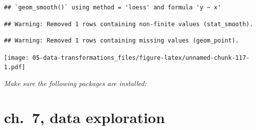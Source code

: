 \documentclass[]{book}
\newenvironment{Shaded}{\begin{snugshade}}{\end{snugshade}}
\newcommand{\DataTypeTok}[1]{\textcolor[rgb]{0.13,0.29,0.53}{#1}}
\newcommand{\KeywordTok}[1]{\textcolor[rgb]{0.13,0.29,0.53}{\textbf{#1}}}
\newcommand{\NormalTok}[1]{#1}
\newcommand{\OperatorTok}[1]{\textcolor[rgb]{0.81,0.36,0.00}{\textbf{#1}}}
\newcommand{\OtherTok}[1]{\textcolor[rgb]{0.56,0.35,0.01}{#1}}
\newcommand{\StringTok}[1]{\textcolor[rgb]{0.31,0.60,0.02}{#1}}
\theoremstyle{definition}
\theoremstyle{definition}
\theoremstyle{definition}
\theoremstyle{remark}
\begin{document}
\begin{Shaded}
\end{Shaded}

\begin{verbatim}
## `geom_smooth()` using method = 'loess' and formula 'y ~ x'
\end{verbatim}

\begin{verbatim}
## Warning: Removed 1 rows containing non-finite values (stat_smooth).
\end{verbatim}

\begin{verbatim}
## Warning: Removed 1 rows containing missing values (geom_point).
\end{verbatim}

\texttt{[image: 05-data-transformations\_files/figure-latex/unnamed-chunk-117-1.pdf]}

\emph{Make sure the following packages are installed:}

\hypertarget{ch.-7-data-exploration}{%
\chapter{ch.~7, data exploration}\label{ch.-7-data-exploration}}
\end{document}
